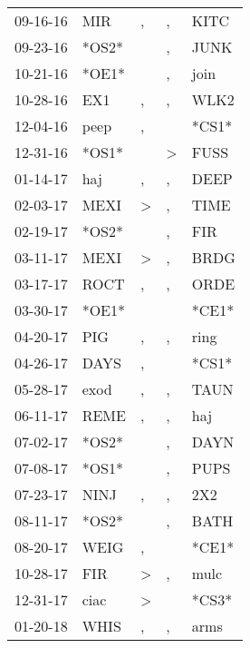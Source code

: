 \begin{supertabular}{lllll}
 09-16-16 &    MIR &                , &                , &   KITC \\
 09-23-16 &  *OS2* &                  &                , &   JUNK \\
 10-21-16 &  *OE1* &                  &                , &   join \\
 10-28-16 &    EX1 &                , &                , &   WLK2 \\
 12-04-16 &   peep &                , &                  &  *CS1* \\
 12-31-16 &  *OS1* &                  &     \textgreater &   FUSS \\
 01-14-17 &    haj &                , &                , &   DEEP \\
 02-03-17 &   MEXI &     \textgreater &                , &   TIME \\
 02-19-17 &  *OS2* &                  &                , &    FIR \\
 03-11-17 &   MEXI &     \textgreater &                , &   BRDG \\
 03-17-17 &   ROCT &                , &                , &   ORDE \\
 03-30-17 &  *OE1* &                  &                  &  *CE1* \\
 04-20-17 &    PIG &                , &                , &   ring \\
 04-26-17 &   DAYS &                , &                  &  *CS1* \\
 05-28-17 &   exod &                , &                , &   TAUN \\
 06-11-17 &   REME &                , &                , &    haj \\
 07-02-17 &  *OS2* &                  &                , &   DAYN \\
 07-08-17 &  *OS1* &                  &                , &   PUPS \\
 07-23-17 &   NINJ &                , &                , &    2X2 \\
 08-11-17 &  *OS2* &                  &                , &   BATH \\
 08-20-17 &   WEIG &                , &                  &  *CE1* \\
 10-28-17 &    FIR &     \textgreater &                , &   mulc \\
 12-31-17 &   ciac &     \textgreater &                  &  *CS3* \\
 01-20-18 &   WHIS &                , &                , &   arms \\

\end{supertabular}
